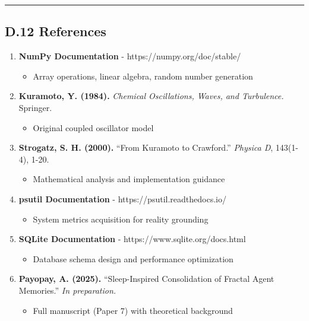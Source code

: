 \documentclass[
]{article}
\providecommand{\tightlist}{%
  \setlength{\itemsep}{0pt}\setlength{\parskip}{0pt}}
\begin{document}
\begin{center}\rule{0.5\linewidth}{0.5pt}\end{center}

\subsection{D.12 References}\label{d.12-references}

\begin{enumerate}
\def\labelenumi{\arabic{enumi}.}
\tightlist
\item
  \textbf{NumPy Documentation} - https://numpy.org/doc/stable/

  \begin{itemize}
  \tightlist
  \item
    Array operations, linear algebra, random number generation
  \end{itemize}
\item
  \textbf{Kuramoto, Y. (1984).} \emph{Chemical Oscillations, Waves, and
  Turbulence.} Springer.

  \begin{itemize}
  \tightlist
  \item
    Original coupled oscillator model
  \end{itemize}
\item
  \textbf{Strogatz, S. H. (2000).} ``From Kuramoto to Crawford.''
  \emph{Physica D}, 143(1-4), 1-20.

  \begin{itemize}
  \tightlist
  \item
    Mathematical analysis and implementation guidance
  \end{itemize}
\item
  \textbf{psutil Documentation} - https://psutil.readthedocs.io/

  \begin{itemize}
  \tightlist
  \item
    System metrics acquisition for reality grounding
  \end{itemize}
\item
  \textbf{SQLite Documentation} - https://www.sqlite.org/docs.html

  \begin{itemize}
  \tightlist
  \item
    Database schema design and performance optimization
  \end{itemize}
\item
  \textbf{Payopay, A. (2025).} ``Sleep-Inspired Consolidation of Fractal
  Agent Memories.'' \emph{In preparation.}

  \begin{itemize}
  \tightlist
  \item
    Full manuscript (Paper 7) with theoretical background
  \end{itemize}
\end{enumerate}
\end{document}
